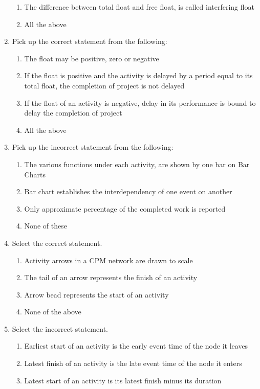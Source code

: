 \documentclass[11pt,a4paper]{article}
\begin{document}
\begin{enumerate}
\begin{enumerate}[label=\Alph*.]
\item{The difference between total float and free float, is called interfering float}
\item{All the above}
\end{enumerate}
\item{Pick up the correct statement from the following:}
\begin{enumerate}[label=\Alph*.]
\item{The float may be positive, zero or negative}
\item{If the float is positive and the activity is delayed by a period equal to its total float, the completion of project is not delayed}
\item{If the float of an activity is negative, delay in its performance is bound to delay the completion of project}
\item{All the above}
\end{enumerate}
\item{Pick up the incorrect statement from the following:}
\begin{enumerate}[label=\Alph*.]
\item{The various functions under each activity, are shown by one bar on Bar Charts}
\item{Bar chart establishes the interdependency of one event on another}
\item{Only approximate percentage of the completed work is reported}
\item{None of these}
\end{enumerate}
\item{Select the correct statement.}
\begin{enumerate}[label=\Alph*.]
\item{Activity arrows in a CPM network are drawn to scale}
\item{The tail of an arrow represents the finish of an activity}
\item{Arrow bead represents the start of an activity}
\item{None of the above}
\end{enumerate}
\item{Select the incorrect statement.}
\begin{enumerate}[label=\Alph*.]
\item{Earliest start of an activity is the early event time of the node it leaves}
\item{Latest finish of an activity is the late event time of the node it enters}
\item{Latest start of an activity is its latest finish minus its duration}

\end{enumerate}
\end{enumerate}
\end{document}
